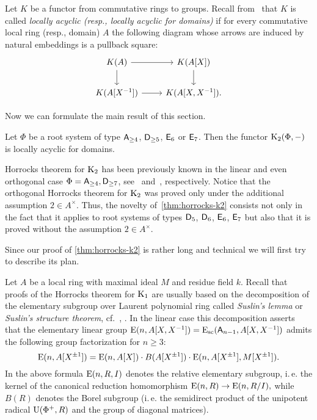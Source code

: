 \usepackage{amssymb}\begin{dfn}
    Let $K$ be a functor from commutative rings to groups.
    Recall from~\cite{LSV2} that $K$ is called \textit{locally acyclic (resp., locally acyclic for domains)} if for every commutative local ring (resp., domain)
     $A$ the following diagram whose arrows are induced by natural embeddings is a pullback square:
    \begin{equation}\label{eq:P1-square} \begin{tikzcd} K(A) \ar[r] \ar[d] & K(A[X]) \arrow{d} \\ K(A[X\inv]) \ar{r} & K(A[X, X\inv]). \end{tikzcd} \end{equation}
\end{dfn}

Now we can formulate the main result of this section.
\begin{thm}\label{thm:horrocks-k2}
Let $\Phi$ be a root system of type $\mathsf{A}_{\geq 4}$, $\mathsf{D}_{\geq 5}$, $\mathsf{E}_6$ or $\mathsf{E}_7$.
Then the functor $\operatorname{K}_{2}(\Phi, -)$ is locally acyclic for domains.
\end{thm}
Horrocks theorem for $\operatorname{K}_2$ has been previously known in the linear and even orthogonal case $\Phi=\mathsf{A}_{\geq 4},\mathsf{D}_{\geq 7}$, see~\cite[Proposition~4.3]{Tu83} and~\cite[Theorem~1]{LS20}, respectively.
Notice that the orthogonal Horrocks theorem for $\operatorname{K}_2$ \cite[Theorem~1]{LS20} was proved only under the additional assumption $2 \in A^\times$.
Thus, the novelty of~\cref{thm:horrocks-k2} consists not only in the fact that it applies to root systems of types $\mathsf{D}_5$, $\mathsf{D}_6$, $\mathsf{E}_6$, $\mathsf{E}_7$ but also that
 it is proved without the assumption $2 \in A^\times$.

Since our proof of \cref{thm:horrocks-k2} is rather long and technical we will first try to describe its plan.

Let $A$ be a local ring with maximal ideal $M$ and residue field $k$.
Recall that proofs of the Horrocks theorem for $\operatorname{K}_1$ are usually based on the decomposition of the elementary subgroup over Laurent polynomial ring
 called \textit{Suslin's lemma} or \textit{Suslin's structure theorem}, cf.~\cite{Abe83, Su77}, \cite[\S~VI.6]{Lam10}.
In the linear case this decomposition asserts that the elementary linear group $\operatorname{E}(n, A[X, X^{-1}]) = \operatorname{E}_\mathrm{sc}(\mathsf{A}_{n-1}, A[X, X^{-1}])$ admits the following group factorization for $n \geq 3$:
\begin{equation}\label{eq:triple-decomposition}
\operatorname{E}(n, A[X^{\pm 1}]) = \operatorname{E}(n, A[X]) \cdot B(A[X^{\pm 1}]) \cdot \operatorname{E}(n, A[X^{\pm 1}], M[X^{\pm 1}]).
\end{equation}
In the above formula $\operatorname{E}(n, R, I)$ denotes the relative elementary subgroup, i.\,e. the kernel of the canonical reduction homomorphism $\operatorname{E}(n, R) \to \operatorname{E}(n, R/I),$
 while $B(R)$ denotes the Borel subgroup (i.\,e. the semidirect product of the unipotent radical $\operatorname{U}(\Phi^+, R)$ and the group of diagonal matrices).

